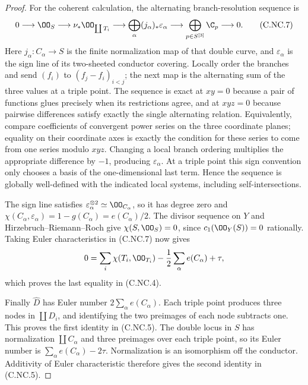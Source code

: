 \begin{proof}
For the coherent calculation, the alternating branch-resolution sequence is
\[
 0\longrightarrow\OO_S\longrightarrow\nu_*\OO_{\coprod T_i}
 \longrightarrow\bigoplus_\alpha(j_\alpha)_*\varepsilon_\alpha
 \longrightarrow\bigoplus_{p\in S^{[3]}}\C_p
 \longrightarrow0.
 \tag{C.NC.7}
\]
Here $j_\alpha:C_\alpha\to S$ is the finite normalization map of that double curve, and $\varepsilon_\alpha$ is the sign line of its two-sheeted conductor covering. Locally order the branches and send $(f_i)$ to $(f_j-f_i)_{i<j}$; the next map is the alternating sum of the three values at a triple point. The sequence is exact at $xy=0$ because a pair of functions glues precisely when its restrictions agree, and at $xyz=0$ because pairwise differences satisfy exactly the single alternating relation. Equivalently, compare coefficients of convergent power series on the three coordinate planes; equality on their coordinate axes is exactly the condition for these series to come from one series modulo $xyz$. Changing a local branch ordering multiplies the appropriate difference by $-1$, producing $\varepsilon_\alpha$. At a triple point this sign convention only chooses a basis of the one-dimensional last term. Hence the sequence is globally well-defined with the indicated local systems, including self-intersections.

The sign line satisfies $\varepsilon_\alpha^{\otimes2}\simeq\OO_{C_\alpha}$, so it has degree zero and $\chi(C_\alpha,\varepsilon_\alpha)=1-g(C_\alpha)=e(C_\alpha)/2$. The divisor sequence on $Y$ and Hirzebruch--Riemann--Roch give $\chi(S,\OO_S)=0$, since $c_1(\OO_Y(S))=0$ rationally. Taking Euler characteristics in (C.NC.7) now gives
\[
 0=\sum_i\chi(T_i,\OO_{T_i})-\frac12\sum_\alpha e(C_\alpha)+\tau,
\]
which proves the last equality in (C.NC.4).

Finally $\widehat D$ has Euler number $2\sum_\alpha e(C_\alpha)$. Each triple point produces three nodes in $\coprod D_i$, and identifying the two preimages of each node subtracts one. This proves the first identity in (C.NC.5). The double locus in $S$ has normalization $\coprod C_\alpha$ and three preimages over each triple point, so its Euler number is $\sum_\alpha e(C_\alpha)-2\tau$. Normalization is an isomorphism off the conductor. Additivity of Euler characteristic therefore gives the second identity in (C.NC.5).
\end{proof}

